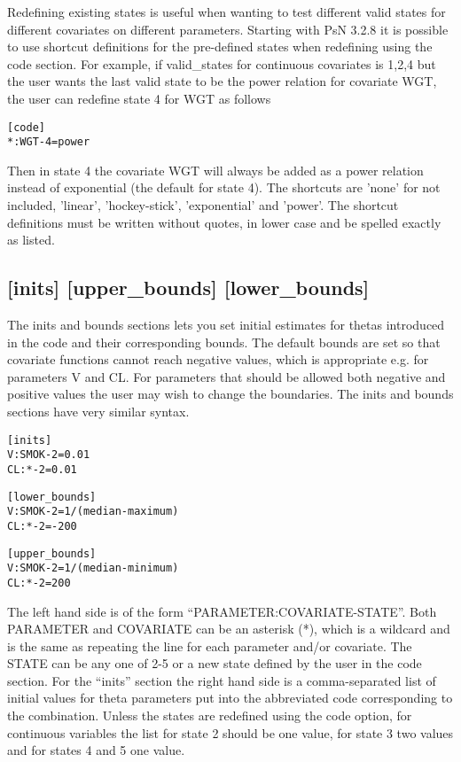 Redefining existing states is useful when wanting to test different valid states for different covariates on different parameters. Starting with PsN 3.2.8 it is possible to use shortcut definitions for the pre-defined states when redefining using the code section. For example, if valid\_states for continuous covariates is 1,2,4 but the user wants the last valid state to be the power relation for covariate WGT, the user can redefine state 4 for WGT as follows
\begin{verbatim}
[code]
*:WGT-4=power
\end{verbatim}
Then in state 4 the covariate WGT will always be added as a power relation instead of exponential (the default for state 4). The shortcuts are 'none' for not included, 'linear', 'hockey-stick', 'exponential' and 'power'. The shortcut definitions must be written without quotes, in lower case and be spelled exactly as listed. 

\subsection{[inits] [upper\_bounds] [lower\_bounds]}
The inits and bounds sections lets you set initial estimates for thetas introduced in the code and their corresponding bounds. The default bounds are set so that covariate functions cannot reach negative values, which is appropriate e.g. for parameters V and CL. For parameters that should be allowed both negative and positive values the user may wish to change the boundaries. The inits and bounds sections have very similar syntax.

\begin{verbatim}
[inits]
V:SMOK-2=0.01
CL:*-2=0.01
\end{verbatim}

\begin{verbatim}
[lower_bounds]
V:SMOK-2=1/(median-maximum)
CL:*-2=-200
\end{verbatim}

\begin{verbatim}
[upper_bounds]
V:SMOK-2=1/(median-minimum)
CL:*-2=200
\end{verbatim}

The left hand side is of the form “PARAMETER:COVARIATE-STATE”. Both PARAMETER and COVARIATE can be an asterisk (*), which is a wildcard and is the same as repeating the line for each parameter and/or covariate. The STATE can be any one of 2-5 or a new state defined by the user in the code section. For the “inits” section the right hand side is a comma-separated list of initial values for theta parameters put into the abbreviated code corresponding to the combination. Unless the states are redefined using the code option, for continuous variables the list for state 2 should be one value, for state 3 two values and for states 4 and 5 one value. 

